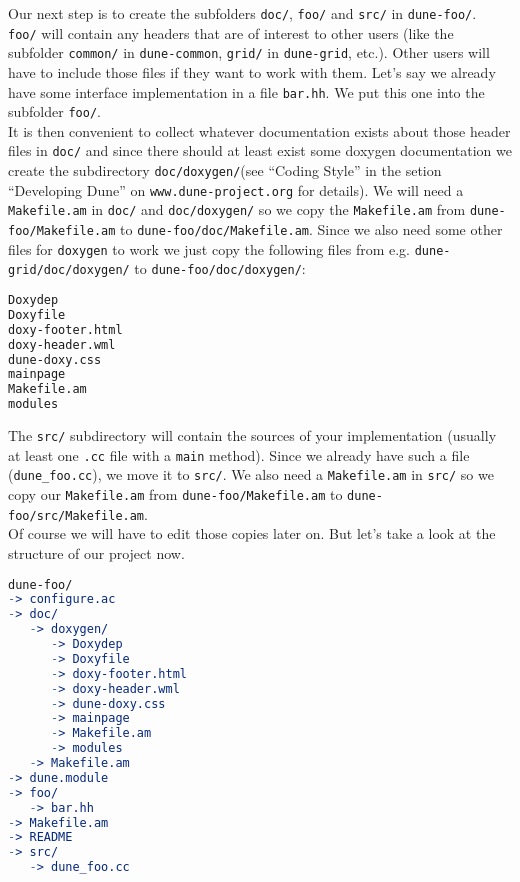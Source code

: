 \documentclass[11pt,a4paper,headinclude,footinclude,DIV16,normalheadings]{scrartcl}
\newcommand{\makefileam}{\texttt{Makefile.am}\xspace}
\newcommand{\dunecommon}{\texttt{dune-common}\xspace}
\newcommand{\dunegrid}{\texttt{dune-grid}\xspace}
\begin{document}
Our next step is to create the subfolders \texttt{doc/}\xspace,
\texttt{foo/}\xspace and \texttt{src/}\xspace in \texttt{dune-foo/}\xspace.\\
\texttt{foo/}\xspace will contain any headers that are of interest to other
users (like the subfolder \texttt{common/}\xspace in
\dunecommon, \texttt{grid/}\xspace in \dunegrid, etc.). Other users will have to
include those files if they want to work with them. Let's say we already have some interface implementation
in a file \texttt{bar.hh}\xspace. We put this one into the subfolder
\texttt{foo/}\xspace.\\
It is then convenient to collect whatever documentation exists about those
header files in \texttt{doc/}\xspace and since there should
at least exist some doxygen documentation we create the
subdirectory \texttt{doc/doxygen/}\xspace (see ``Coding Style'' in the
setion ``Developing Dune'' on \texttt{www.dune-project.org} for details).
We will need a \makefileam in
\texttt{doc/}\xspace and \texttt{doc/doxygen/}\xspace so we copy the
\makefileam from \texttt{dune-foo/Makefile.am}\xspace to
\texttt{dune-foo/doc/Makefile.am}. Since we also need
some other files for \texttt{doxygen}\xspace to work we just copy the
following files from e.g. \texttt{dune-grid/doc/doxygen/}\xspace to
\texttt{dune-foo/doc/doxygen/}\xspace:

\begin{lstlisting}[language=make]
Doxydep
Doxyfile
doxy-footer.html
doxy-header.wml
dune-doxy.css
mainpage
Makefile.am
modules
\end{lstlisting}

The \texttt{src/}\xspace subdirectory will contain the sources of your
implementation (usually at least one \texttt{.cc}\xspace file with a
\texttt{main} method). Since we already have such a file
(\texttt{dune\_foo.cc}), we move it to \texttt{src/}\xspace. We also need
a \makefileam in \texttt{src/}\xspace so we copy our \makefileam from
\texttt{dune-foo/Makefile.am}\xspace to
\texttt{dune-foo/src/Makefile.am}\xspace.\\
Of course we will have to edit those copies later on. But let's take a
look at the structure of our project now.

\begin{lstlisting}[language=make]
dune-foo/
-> configure.ac
-> doc/
   -> doxygen/
      -> Doxydep
      -> Doxyfile
      -> doxy-footer.html
      -> doxy-header.wml
      -> dune-doxy.css
      -> mainpage
      -> Makefile.am
      -> modules
   -> Makefile.am
-> dune.module
-> foo/
   -> bar.hh
-> Makefile.am
-> README
-> src/
   -> dune_foo.cc
\end{lstlisting}
\end{document}

